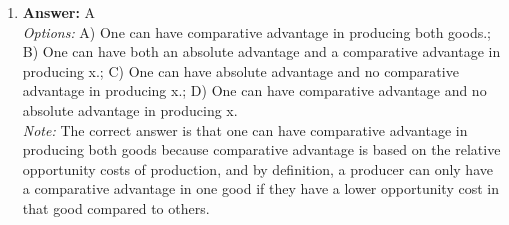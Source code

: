 \documentclass[12pt]{article}
\begin{document}
\begin{enumerate}[label=\arabic*.]
\\ \textit{Note:} The correct answer is based on the money multiplier effect, where a reserve requirement of five percent means that for every dollar the FED withdraws through the sale of securities, the total money supply can decrease by up to 20 times that amount, resulting in a potential decrease of $200 million from the initial $10 million sold.
\item \textbf{Answer:} A
\\ \textit{Options:} A) One can have comparative advantage in producing both goods.; B) One can have both an absolute advantage and a comparative advantage in producing x.; C) One can have absolute advantage and no comparative advantage in producing x.; D) One can have comparative advantage and no absolute advantage in producing x.
\\ \textit{Note:} The correct answer is that one can have comparative advantage in producing both goods because comparative advantage is based on the relative opportunity costs of production, and by definition, a producer can only have a comparative advantage in one good if they have a lower opportunity cost in that good compared to others.
\end{enumerate}
\end{document}
